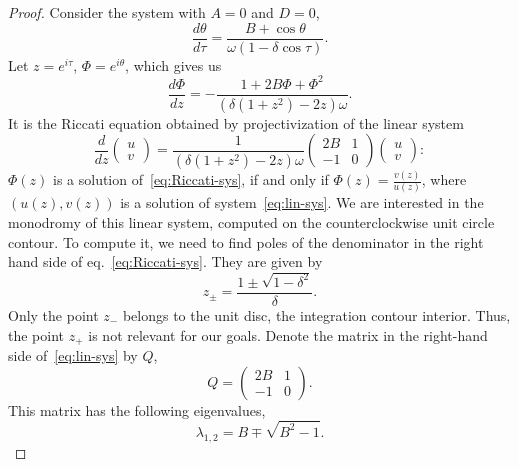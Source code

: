 \documentclass[10pt,a4paper]{amsart}
\begin{document}
\begin{proof}

Consider the system with $A=0$ and $D=0$,
\begin{equation}\label{eq:zero-AD-tor-sys}
    \frac{d\theta}{d\tau} = \frac{B+\cos\theta}{\omega(1-\delta\cos\tau)}.
\end{equation}
Let $z=e^{i\tau}$, $\Phi=e^{i\theta}$, which gives us
\begin{equation}\label{eq:Riccati-sys}
    \frac{d\Phi}{dz}=-\frac{1+2B\Phi+\Phi^2}{(\delta(1+z^2)-2z)\omega}.
\end{equation}
It is the Riccati equation obtained by  projectivization of the linear system 
\begin{equation}\label{eq:lin-sys}
    \frac{d}{dz}
    \begin{pmatrix}
        u \\ v
    \end{pmatrix}=
    \frac{1}{(\delta(1+z^2)-2z)\omega}
    \begin{pmatrix}
        2B & 1 \\ -1 & 0
    \end{pmatrix}
    \begin{pmatrix}
        u \\ v
    \end{pmatrix}:
\end{equation}
$\Phi(z)$ is a solution of~\eqref{eq:Riccati-sys}, if and only if $\Phi(z)=\frac{v(z)}{u(z)}$, where $(u(z),v(z))$ is a solution of system~\eqref{eq:lin-sys}. 
We are interested in the monodromy of this linear system, computed on the counterclockwise unit circle contour. To compute it, we need to find poles of the denominator in the right hand side of eq.~\eqref{eq:Riccati-sys}. They are given by
\begin{equation}
    z_{\pm} = \frac{1\pm\sqrt{1-\delta^2}}{\delta}.
\end{equation}
Only the point $z_{-}$ belongs to the unit disc, the integration contour interior. Thus, the point $z_+$ is not relevant for our goals. Denote the matrix in the right-hand side of~\eqref{eq:lin-sys} by $Q$,
\begin{equation}
    Q=
    \begin{pmatrix}
        2B & 1 \\ -1 & 0
    \end{pmatrix}.
\end{equation}
This matrix has the following eigenvalues,
\begin{equation}
    \lambda_{1,2}=B\mp\sqrt{B^2-1}.

\end{equation}
\end{proof}
\end{document}
